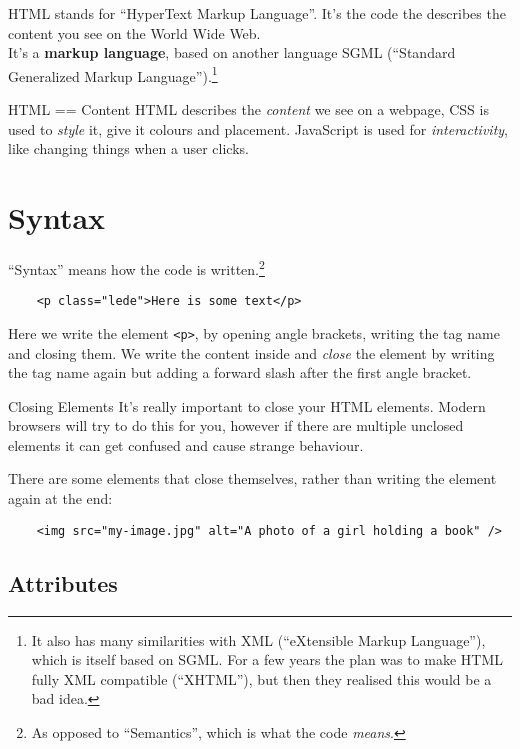 HTML stands for ``HyperText Markup Language''. It's the code the describes the content you see on the World Wide Web.
\\

It's a \textbf{markup language}, based on another language SGML (``Standard Generalized Markup Language'').\footnote{It also has many similarities with XML (``eXtensible Markup Language''), which is itself based on SGML. For a few years the plan was to make HTML fully XML compatible (``XHTML''), but then they realised this would be a bad idea.}

\begin{infobox}{HTML == Content}
    HTML describes the \textit{content} we see on a webpage, CSS is used to \textit{style} it, give it colours and placement. JavaScript is used for \textit{interactivity}, like changing things when a user clicks.
\end{infobox}


\section{Syntax}

``Syntax'' means how the code is written.\footnote{As opposed to ``Semantics'', which is what the code \textit{means}.}

\begin{verbatim}
    <p class="lede">Here is some text</p>
\end{verbatim}

Here we write the element \texttt{<p>}, by opening angle brackets, writing the tag name and closing them. We write the content inside and \textit{close} the element by writing the tag name again but adding a forward slash after the first angle bracket.

\begin{infobox}{Closing Elements}
    It's really important to close your HTML elements. Modern browsers will try to do this for you, however if there are multiple unclosed elements it can get confused and cause strange behaviour.
\end{infobox}

There are some elements that close themselves, rather than writing the element again at the end:

\begin{verbatim}
    <img src="my-image.jpg" alt="A photo of a girl holding a book" />
\end{verbatim}


\subsection{Attributes}

